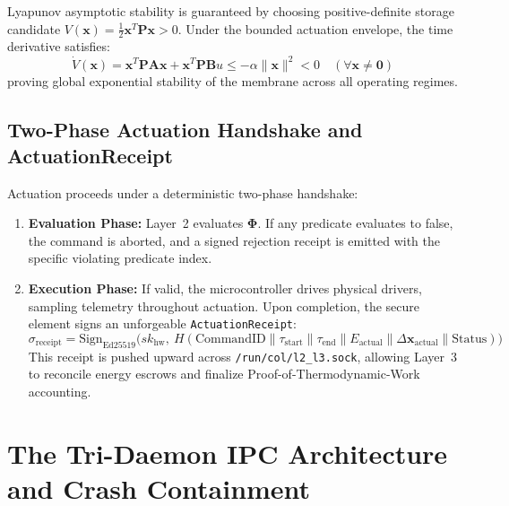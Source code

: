 Lyapunov asymptotic stability is guaranteed by choosing positive-definite storage candidate $V(\mathbf{x}) = \frac{1}{2} \mathbf{x}^T \mathbf{P} \mathbf{x} > 0$. Under the bounded actuation envelope, the time derivative satisfies:
\begin{equation}
\dot{V}(\mathbf{x}) = \mathbf{x}^T \mathbf{P} \mathbf{A} \mathbf{x} + \mathbf{x}^T \mathbf{P} \mathbf{B} u \le -\alpha \|\mathbf{x}\|^2 < 0 \quad (\forall \mathbf{x} \neq \mathbf{0})
\label{eq:l2_lyapunov}
\end{equation}
proving global exponential stability of the membrane across all operating regimes.

\subsection{Two-Phase Actuation Handshake and ActuationReceipt}

Actuation proceeds under a deterministic two-phase handshake:
\begin{enumerate}
    \item \textbf{Evaluation Phase:} Layer~2 evaluates $\mathbf{\Phi}$. If any predicate evaluates to false, the command is aborted, and a signed rejection receipt is emitted with the specific violating predicate index.
    \item \textbf{Execution Phase:} If valid, the microcontroller drives physical drivers, sampling telemetry throughout actuation. Upon completion, the secure element signs an unforgeable \texttt{ActuationReceipt}:
    \begin{equation}
    \sigma_{\mathrm{receipt}} = \mathrm{Sign}_{\mathrm{Ed25519}}\Big(sk_{\mathrm{hw}}, \ H(\mathrm{CommandID} \parallel \tau_{\mathrm{start}} \parallel \tau_{\mathrm{end}} \parallel E_{\mathrm{actual}} \parallel \Delta \mathbf{x}_{\mathrm{actual}} \parallel \mathrm{Status})\Big)
    \label{eq:l2_receipt_sig}
    \end{equation}
    This receipt is pushed upward across \texttt{/run/col/l2\_l3.sock}, allowing Layer~3 to reconcile energy escrows and finalize Proof-of-Thermodynamic-Work accounting.
\end{enumerate}

\section{The Tri-Daemon IPC Architecture and Crash Containment}
\label{sec:l2_daemons_crash}

